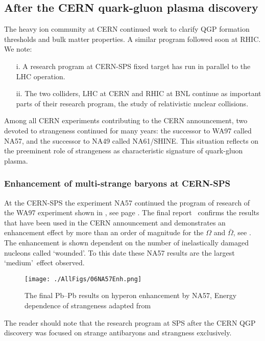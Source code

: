 \subsection{After the CERN quark-gluon plasma discovery}
The heavy ion community at CERN continued work to clarify QGP formation thresholds and bulk matter properties. A similar program followed soon at RHIC. We note:
\begin{itemize}
\item[\phantom{i}i.] A research program at CERN-SPS fixed target has run in parallel to the LHC operation. 
\item[ii.] The two colliders, LHC at CERN and RHIC at BNL continue as important parts of their research program, the study of relativistic nuclear collisions.
\end{itemize}
Among all CERN experiments contributing to the CERN announcement, two devoted to strangeness continued for many years: the successor to WA97 called NA57, and the successor to NA49 called NA61/SHINE. This situation reflects on the preeminent role of strangeness as characteristic signature of quark-gluon plasma.
 
\subsubsection{Enhancement of multi-strange baryons at CERN-SPS}
At the CERN-SPS the experiment NA57 continued the program of research of the WA97 experiment shown in , see page \pageref{RSS}. The final report~\cite{Antinori:2006ij} confirms the results that have been used in the CERN announcement and demonstrates an enhancement effect by more than an order of magnitude for the $\Omega$ and $\bar \Omega$, see . The enhancement is shown dependent on the number of inelastically damaged nucleons called \lq wounded\rq. To this date these NA57 results are the largest \lq medium\rq\ effect observed.

\begin{figure}\sidecaption
\centerline{
\texttt{[image: ./AllFigs/06NA57Enh.png]}
}
\caption{The final Pb--Pb results on hyperon enhancement by NA57, Energy dependence of strangeness adapted from~\cite{Antinori:2006ij} 
}
\label{fig:NA57}
\end{figure}

The reader should note that the research program at SPS after the CERN QGP discovery was focused on strange antibaryons and strangness exclusively.

